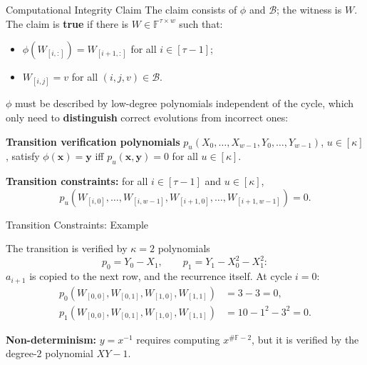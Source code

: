 \documentclass{zkdl-presentation-template}
\begin{document}
    \begin{frame}{Computational Integrity Claim}
        The claim consists of $\phi$ and $\mathcal{B}$; the witness is $W$. The claim is \textbf{true} if there is $W \in \mathbb{F}^{\tau \times w}$ such that:
        \begin{itemize}
            \item $\phi(W_{[i, :]}) = W_{[i+1, :]}$ for all $i \in [\tau - 1]$;
            \item $W_{[i, j]} = v$ for all $(i, j, v) \in \mathcal{B}$.
        \end{itemize}
        \pause

        $\phi$ must be described by low-degree polynomials independent of the cycle, which only need to \textbf{distinguish} correct evolutions from incorrect ones:
        \pause
        \begin{definition}
            \textbf{Transition verification polynomials} $p_u(X_0, \ldots, X_{w-1}, Y_0, \ldots, Y_{w-1})$, $u \in [\kappa]$, satisfy $\phi(\mathbf{x}) = \mathbf{y}$ iff $p_u(\mathbf{x}, \mathbf{y}) = 0$ for all $u \in [\kappa]$.
        \end{definition}
        \pause
        \textbf{Transition constraints:} for all $i \in [\tau - 1]$ and $u \in [\kappa]$,
        \begin{equation*}
            p_u(W_{[i, 0]}, \ldots, W_{[i, w-1]}, W_{[i+1, 0]}, \ldots, W_{[i+1, w-1]}) = 0.
        \end{equation*}
    \end{frame}

    \begin{frame}{Transition Constraints: Example}
        \begin{example}
            The transition is verified by $\kappa = 2$ polynomials
            \begin{equation*}
                p_0 = Y_0 - X_1, \qquad p_1 = Y_1 - X_0^2 - X_1^2:
            \end{equation*}
            $a_{i+1}$ is copied to the next row, and the recurrence itself. At cycle $i = 0$:
            \begin{align*}
                p_0(W_{[0, 0]}, W_{[0, 1]}, W_{[1, 0]}, W_{[1, 1]}) &= 3 - 3 = 0, \\
                p_1(W_{[0, 0]}, W_{[0, 1]}, W_{[1, 0]}, W_{[1, 1]}) &= 10 - 1^2 - 3^2 = 0.
            \end{align*}
        \end{example}
        \pause

        \textbf{Non-determinism:} $y = x^{-1}$ requires computing $x^{\#\mathbb{F} - 2}$, but it is verified by the degree-$2$ polynomial $XY - 1$.
    \end{frame}
\end{document}
